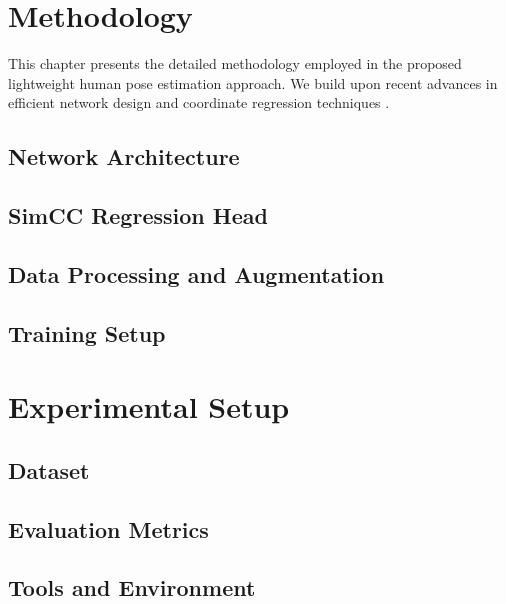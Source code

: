 \documentclass[a4paper,12pt]{article}
\begin{document}
\section{Methodology}
This chapter presents the detailed methodology employed in the proposed lightweight human pose estimation approach. We build upon recent advances in efficient network design and coordinate regression techniques \cite{Dubey2023PoseSurvey}.


\subsection{Network Architecture}


\subsection{SimCC Regression Head}


\subsection{Data Processing and Augmentation}


\subsection{Training Setup}


\section{Experimental Setup}
\subsection{Dataset}


\subsection{Evaluation Metrics}


\subsection{Tools and Environment}

\end{document}
